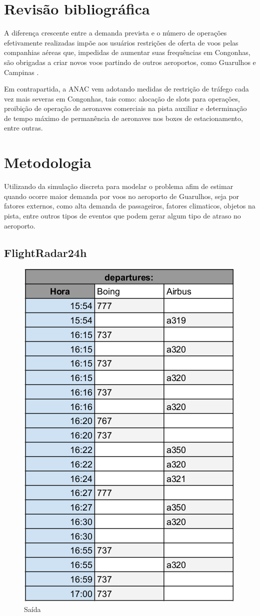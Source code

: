 \documentclass[12pt]{article}
\begin{document}
\section{Revisão bibliográfica} \label{sec:revisaobibliografica}

A diferença crescente entre a demanda prevista e o número de
operações efetivamente realizadas impõe aos usuários
restrições de oferta de voos pelas companhias aéreas que,
impedidas de aumentar suas frequências em Congonhas, são 
obrigadas a criar novos voos partindo de outros aeroportos,
como Guarulhos e Campinas \cite{boulic:91}.

Em contrapartida, a ANAC vem adotando medidas de restrição 
de tráfego cada vez mais severas em Congonhas, tais como: 
alocação de slots para operações, proibição de operação de 
aeronaves comerciais na pista auxiliar e determinação de tempo
máximo de permanência de aeronaves nos boxes de estacionamento,
entre outras\cite{Medau:09}. 







\section{Metodologia}

Utilizando da simulação discreta para modelar o problema afim de estimar
quando ocorre maior demanda por voos no aeroporto de Guarulhos, seja por
fatores externos, como alta demanda de passageiros, fatores climaticos,
objetos na pista, entre outros tipos de eventos que podem gerar algum 
tipo de atraso no aeroporto.


\subsection{FlightRadar24h}


\begin{figure}[ht]
  \centering
  \includegraphics[width=.3\textwidth]{decolagem.png}
  \caption{Saída}
  \label{fig:saida}
\end{figure}
\end{document}
